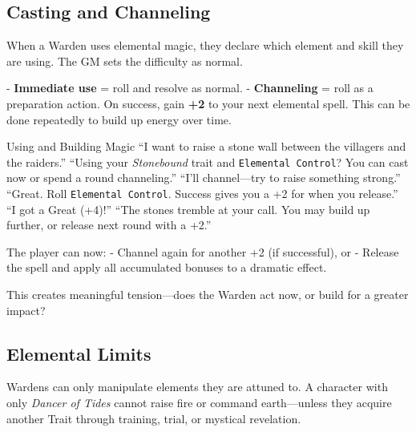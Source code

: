 \subsection{Casting and Channeling}


When a Warden uses elemental magic, they declare which element and skill they are using. The GM sets the difficulty as normal.

- \textbf{Immediate use} = roll and resolve as normal.
- \textbf{Channeling} = roll as a preparation action. On success, gain \textbf{+2} to your next elemental spell. This can be done repeatedly to build up energy over time.

\begin{ExampleGame}{Using and Building Magic}
    \line[Player] “I want to raise a stone wall between the villagers and the raiders.”
    \line[GM]     “Using your \textit{Stonebound} trait and \texttt{Elemental Control}? You can cast now or spend a round channeling.”
    \line[Player] “I’ll channel—try to raise something strong.”
    \line[GM]     “Great. Roll \texttt{Elemental Control}. Success gives you a +2 for when you release.”
    \line[Player] “I got a Great (+4)!”
    \line[GM]     “The stones tremble at your call. You may build up further, or release next round with a +2.”
\end{ExampleGame}

The player can now:
- Channel again for another +2 (if successful), or  
- Release the spell and apply all accumulated bonuses to a dramatic effect.

This creates meaningful tension—does the Warden act now, or build for a greater impact?

\subsection{Elemental Limits}

Wardens can only manipulate elements they are attuned to. A character with only \textit{Dancer of Tides} cannot raise fire or command earth—unless they acquire another Trait through training, trial, or mystical revelation.

